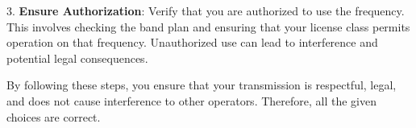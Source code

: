 3. \textbf{Ensure Authorization}: Verify that you are authorized to use the frequency. This involves checking the band plan and ensuring that your license class permits operation on that frequency. Unauthorized use can lead to interference and potential legal consequences.

By following these steps, you ensure that your transmission is respectful, legal, and does not cause interference to other operators. Therefore, all the given choices are correct.

